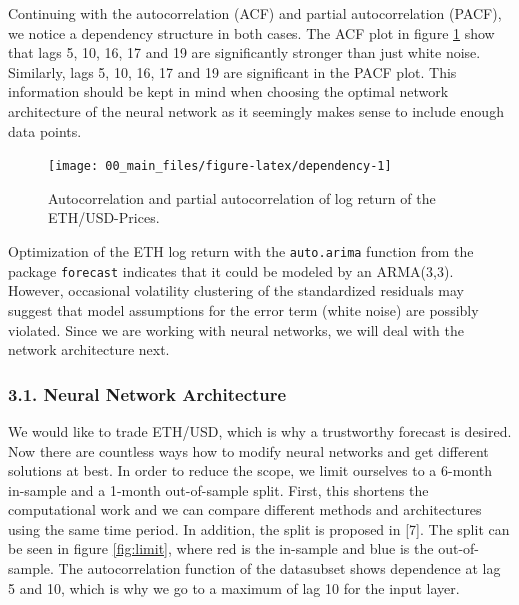 \documentclass[
]{article}
\begin{document}
\newpage

Continuing with the autocorrelation (ACF) and partial autocorrelation
(PACF), we notice a dependency structure in both cases. The ACF plot in
figure \ref{fig:dependency} show that lags 5, 10, 16, 17 and 19 are
significantly stronger than just white noise. Similarly, lags 5, 10, 16,
17 and 19 are significant in the PACF plot. This information should be
kept in mind when choosing the optimal network architecture of the
neural network as it seemingly makes sense to include enough data
points.

\begin{figure}

{\centering \texttt{[image: 00\_main\_files/figure-latex/dependency-1]} 

}

\caption{Autocorrelation and partial autocorrelation of log return of the ETH/USD-Prices.}\label{fig:dependency}
\end{figure}

Optimization of the ETH log return with the \texttt{auto.arima} function
from the package \texttt{forecast} indicates that it could be modeled by
an ARMA(3,3). However, occasional volatility clustering of the
standardized residuals may suggest that model assumptions for the error
term (white noise) are possibly violated. Since we are working with
neural networks, we will deal with the network architecture next.

\newpage

\hypertarget{neural-network-architecture}{%
\subsubsection{3.1. Neural Network
Architecture}\label{neural-network-architecture}}

We would like to trade ETH/USD, which is why a trustworthy forecast is
desired. Now there are countless ways how to modify neural networks and
get different solutions at best. In order to reduce the scope, we limit
ourselves to a 6-month in-sample and a 1-month out-of-sample split.
First, this shortens the computational work and we can compare different
methods and architectures using the same time period. In addition, the
split is proposed in {[}7{]}. The split can be seen in figure
\ref{fig:limit}, where red is the in-sample and blue is the
out-of-sample. The autocorrelation function of the datasubset shows
dependence at lag 5 and 10, which is why we go to a maximum of lag 10
for the input layer.
\end{document}
